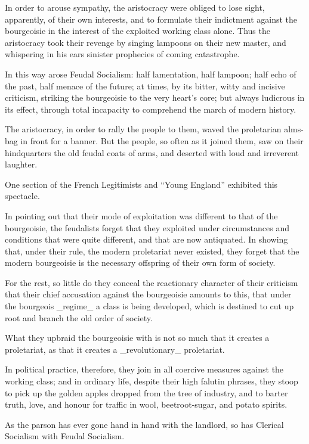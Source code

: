 In order to arouse sympathy, the aristocracy were obliged to lose
sight, apparently, of their own interests, and to formulate their
indictment against the bourgeoisie in the interest of the exploited
working class alone. Thus the aristocracy took their revenge by singing
lampoons on their new master, and whispering in his ears sinister
prophecies of coming catastrophe.

In this way arose Feudal Socialism: half lamentation, half lampoon;
half echo of the past, half menace of the future; at times, by its
bitter, witty and incisive criticism, striking the bourgeoisie to the
very heart’s core; but always ludicrous in its effect, through total
incapacity to comprehend the march of modern history.

The aristocracy, in order to rally the people to them, waved the
proletarian alms-bag in front for a banner. But the people, so often as
it joined them, saw on their hindquarters the old feudal coats of arms,
and deserted with loud and irreverent laughter.

One section of the French Legitimists and “Young England” exhibited
this spectacle.

In pointing out that their mode of exploitation was different to that
of the bourgeoisie, the feudalists forget that they exploited under
circumstances and conditions that were quite different, and that are
now antiquated. In showing that, under their rule, the modern
proletariat never existed, they forget that the modern bourgeoisie is
the necessary offspring of their own form of society.

For the rest, so little do they conceal the reactionary character of
their criticism that their chief accusation against the bourgeoisie
amounts to this, that under the bourgeois _regime_ a class is being
developed, which is destined to cut up root and branch the old order of
society.

What they upbraid the bourgeoisie with is not so much that it creates a
proletariat, as that it creates a _revolutionary_ proletariat.

In political practice, therefore, they join in all coercive measures
against the working class; and in ordinary life, despite their high
falutin phrases, they stoop to pick up the golden apples dropped from
the tree of industry, and to barter truth, love, and honour for traffic
in wool, beetroot-sugar, and potato spirits.

As the parson has ever gone hand in hand with the landlord, so has
Clerical Socialism with Feudal Socialism.

